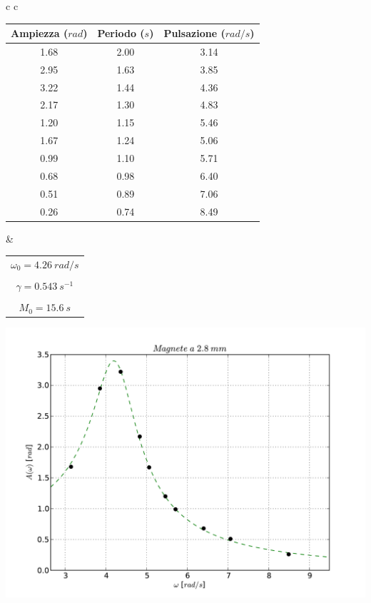 \begin{center}

\begin{tabular}{c c}

\begin{tabular}{c | c | c}
\textbf{Ampiezza} ($rad$) & \textbf{Periodo} ($s$) & \textbf{Pulsazione} ($rad/s$)\\
\midrule
1.68 & 2.00 & 3.14\\
2.95 & 1.63 & 3.85\\
3.22 & 1.44 & 4.36\\
2.17 & 1.30 & 4.83\\
1.20 & 1.15 & 5.46\\
1.67 & 1.24 & 5.06\\
0.99 & 1.10 & 5.71\\
0.68 & 0.98 & 6.40\\
0.51 & 0.89 & 7.06\\
0.26 & 0.74 & 8.49\\
\end{tabular}

& \hspace{1cm}

\begin{tabular}{c}
$ \omega_0 = 4.26\ rad/s $\\
\\
$ \gamma = 0.543\ s^{-1} $\\
\\
$ M_0 = 15.6\ s$\\
\end{tabular}

\end{tabular}

\end{center}

\begin{center}
\includegraphics[scale=0.5]{"../grafici/Magnetea28mm"}
\end{center}


